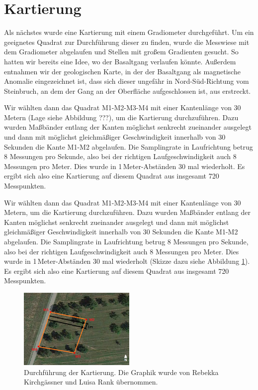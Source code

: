 \section{Kartierung}

Als nächstes wurde eine Kartierung mit einem Gradiometer durchgeführt. Um ein geeignetes Quadrat zur Durchführung dieser zu finden, wurde die Messwiese mit dem Gradiometer abgelaufen und Stellen mit großem Gradienten gesucht. So hatten wir bereits eine Idee, wo der Basaltgang verlaufen könnte. Außerdem entnahmen wir der geologischen Karte, in der der Basaltgang als magnetische Anomalie eingezeichnet ist, dass sich dieser ungefähr in Nord-Süd-Richtung vom Steinbruch, an dem der Gang an der Oberfläche aufgeschlossen ist, aus erstreckt.


Wir wählten dann das Quadrat M1-M2-M3-M4 mit einer Kantenlänge von 30 Metern (Lage siehe Abbildung ???), um die Kartierung durchzuführen. Dazu wurden Maßbänder entlang der Kanten möglichst senkrecht zueinander ausgelegt und dann mit möglichst gleichmäßiger Geschwindigkeit innerhalb von 30 Sekunden die Kante M1-M2 abgelaufen. Die Samplingrate in Laufrichtung betrug 8 Messungen pro Sekunde, also bei der richtigen Laufgeschwindigkeit auch 8 Messungen pro Meter. Dies wurde in 1\,Meter-Abständen 30 mal wiederholt. Es ergibt sich also eine Kartierung auf diesem Quadrat aus insgesamt 720 Messpunkten.

Wir wählten dann das Quadrat M1-M2-M3-M4 mit einer Kantenlänge von 30 Metern, um die Kartierung durchzuführen. Dazu wurden Maßbänder entlang der Kanten möglichst senkrecht zueinander ausgelegt und dann mit möglichst gleichmäßiger Geschwindigkeit innerhalb von 30 Sekunden die Kante M1-M2 abgelaufen. Die Samplingrate in Laufrichtung betrug 8 Messungen pro Sekunde, also bei der richtigen Laufgeschwindigkeit auch 8 Messungen pro Meter. Dies wurde in 1\,Meter-Abständen 30 mal wiederholt (Skizze dazu siehe Abbildung \ref{fig:MessungKartierung}). Es ergibt sich also eine Kartierung auf diesem Quadrat aus insgesamt 720 Messpunkten.

\begin{figure}[!ht]
 \centering
 \includegraphics[width=0.5\textwidth]{fig/Kartierunggps}
 \caption[Durchführung der Kartierung]{Durchführung der Kartierung. Die Graphik wurde von Rebekka Kirchgässner und Luisa Rank übernommen.}
 \label{fig:MessungKartierung}
\end{figure}


